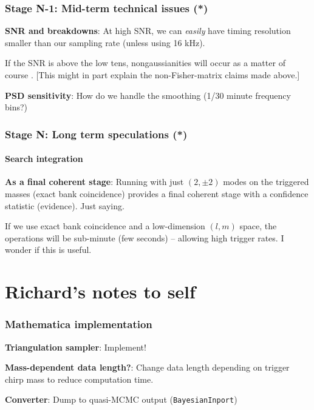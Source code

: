 \documentclass[twocolumn,prd,nofootinbib]{revtex4}
\newcommand\editremark[1]{{\color{red} #1}}
\begin{document}
\section{Stage N-1: Mid-term technical issues (*)}

\noindent \textbf{SNR and breakdowns}: At high SNR, we can \emph{easily} have timing resolution smaller than our
sampling rate (unless using 16 kHz). 

If the SNR is above the low tens, nongaussianities will occur as a matter of course .  [This might in part explain the
  non-Fisher-matrix claims made above.]

\noindent \textbf{PSD sensitivity}: How do we handle the smoothing (1/30 minute  frequency bins?)



\section{Stage N: Long term speculations (*)}


\subsection{Search integration}

\noindent \textbf{As a final coherent stage}: Running with just $(2,\pm 2)$ modes on the triggered masses (exact bank
coincidence) provides a final coherent stage with a confidence statistic (evidence).  Just saying.

If we use exact bank coincidence and a low-dimension $(l,m)$ space, the operations will be sub-minute (few seconds) --
allowing high trigger rates. \editremark{I wonder if this is useful}.



\part{Richard's notes to self}


\section{Mathematica implementation}

\noindent \textbf{Triangulation sampler}: Implement!

\noindent \textbf{Mass-dependent data length?}: Change data length depending on trigger chirp mass to reduce computation time.


\noindent \textbf{Converter}: Dump to quasi-MCMC output (\texttt{BayesianInport})
\end{document}
